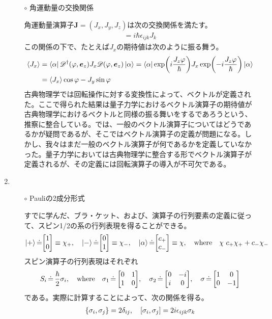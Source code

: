 \documentclass{jarticle}
\begin{document}
\begin{enumerate}
\begin{itemize}
  \item [$\circ$] 角運動量の交換関係

  角運動量演算子$\bm{J} = (J_x, J_y, J_z)$は次の交換関係を満たす。
  \begin{align}
    [J_i, J_j] = i\hbar \epsilon_{ijk}J_k
  \end{align}
  この関係の下で、たとえば$J_x$の期待値は次のように振る舞う。
  \begin{align}
    \ev{J_x} &= \bra{\alpha}\mathscr{D}^\dagger(\varphi, \bm{e}_z)J_x\mathscr{D}(\varphi, \bm{e}_z)\ket{\alpha} = \bra{\alpha}\exp(i\frac{J_z\varphi}{\hbar})J_x\exp(-i\frac{J_z\varphi}{\hbar})\ket{\alpha} \\
             &= \ev{J_x}\cos\varphi - J_y\sin\varphi 
  \end{align}
  古典物理学では回転操作に対する変換性によって、ベクトルが定義された。ここで得られた結果は量子力学におけるベクトル演算子の期待値が古典物理学におけるベクトルと同様の振る舞いをするであろうという、推察に整合している。では、一般のベクトル演算子についてはどうであるかが疑問であるが、そこではベクトル演算子の定義が問題になる。しかし、我々はまだ一般のベクトル演算子が何であるかを定義していなかった。量子力学においては古典物理学に整合する形でベクトル演算子が定義されるが、その定義には回転演算子の導入が不可欠である。
\end{itemize}

\item {}

  \begin{itemize}
  \item [$\circ$] Pauliの2成分形式

    すでに学んだ、ブラ・ケット、および、演算子の行列要素の定義に従って、スピン1/2の系の行列表現を得ることができる。
    \begin{align}
      \ket{+} \dot{=} \mqty[1 \\ 0] \equiv \chi_+, \quad \ket{-} \dot{=} \mqty[0 \\ 1] \equiv \chi_-,\quad   \ket{\alpha}\dot{=} \mqty[c_+ \\ c_-] \equiv \chi, \quad \mathrm{where} \quad
      \chi ~ c_+\chi_+ + c_-\chi_-
    \end{align}
    スピン演算子の行列表現はそれぞれ
    \begin{align}
      S_i \,\dot{=}\, \frac{\hbar}{2}\sigma_i, \quad \mathrm{where} \quad \sigma_1 \,\dot{=}\, \mqty[0 & 1 \\ 1 & 0], \quad \sigma_2 \,\dot{=}\, \mqty[0 & -i \\ i & 0], \quad \sigma \,\dot{=}\,
                                                                                                                                                                     \mqty[1 & 0 \\ 0 & -1]
    \end{align}
    である。実際に計算することによって、次の関係を得る。
    \begin{align}
      \qty{\sigma_i, \sigma_j} = 2\delta_{ij}, \quad [\sigma_i, \sigma_j] = 2i\epsilon_{ijk}\sigma_k
    \end{align}


\end{itemize}
\end{enumerate}
\end{document}

